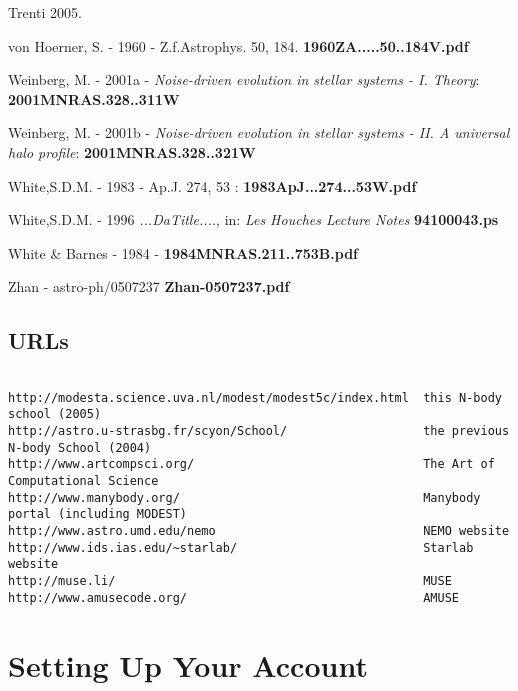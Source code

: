 {Trenti 2005.

von Hoerner, S. - 1960 - Z.f.Astrophys. 50, 184.
{\bf 1960ZA.....50..184V.pdf}


Weinberg, M. - 2001a - 
{\it Noise-driven evolution in stellar systems - I. Theory}:
{\bf 2001MNRAS.328..311W}

Weinberg, M. - 2001b - 
{\it Noise-driven evolution in stellar systems - II. A universal halo profile}:
{\bf 2001MNRAS.328..321W}


White,S.D.M. - 1983 - Ap.J. 274, 53 : {\bf 1983ApJ...274...53W.pdf}

White,S.D.M. - 1996 {\it ...DaTitle....},
in: {\it Les Houches Lecture Notes}
{\bf 94100043.ps}

White \& Barnes - 1984 - {\bf 1984MNRAS.211..753B.pdf}

Zhan - astro-ph/0507237 {\bf Zhan-0507237.pdf}

\section*{URLs}

\footnotesize
\begin{verbatim}

http://modesta.science.uva.nl/modest/modest5c/index.html  this N-body school (2005)
http://astro.u-strasbg.fr/scyon/School/                   the previous N-body School (2004)
http://www.artcompsci.org/                                The Art of Computational Science
http://www.manybody.org/                                  Manybody portal (including MODEST)
http://www.astro.umd.edu/nemo                             NEMO website
http://www.ids.ias.edu/~starlab/                          Starlab website
http://muse.li/                                           MUSE
http://www.amusecode.org/                                 AMUSE

\end{verbatim}
\normalsize


\appendix
\chapter                {Setting Up Your Account}

}
